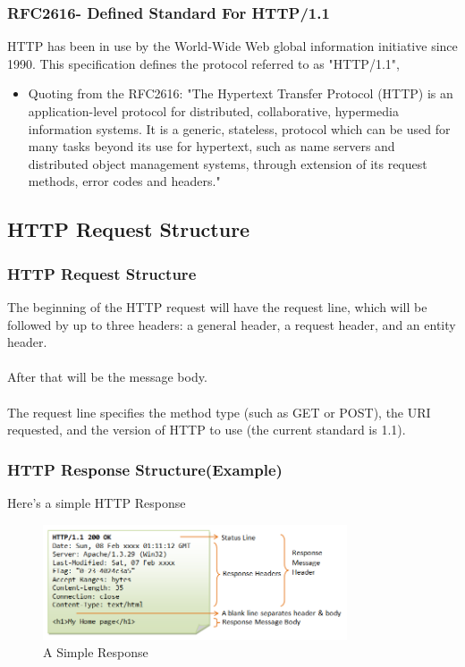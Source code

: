 \documentclass{beamer}
\begin{document}
\begin{frame}
\frametitle{RFC2616- Defined Standard For HTTP/1.1}
HTTP has been in use by the World-Wide Web global information initiative since 1990. This specification defines the protocol referred to as "HTTP/1.1",
\begin{itemize}
\item Quoting from the RFC2616: "The Hypertext Transfer Protocol (HTTP) is an application-level protocol for distributed, collaborative, hypermedia information systems. It is a generic, stateless, protocol which can be used for many tasks beyond its use for hypertext, such as name servers and distributed object management systems, through extension of its request methods, error codes and headers."

\end{itemize}
\end{frame}


\subsection{HTTP Request Structure}

\begin{frame}
\frametitle{HTTP Request Structure}
The beginning of the HTTP request will have the request line, which will be followed by up to three headers: a general header, a request header, and an entity header. \\~\\After that will be the message body. \\~\\The request line specifies the method type (such as GET or POST), the URI requested, and the version of HTTP to use (the current standard is 1.1).

\end{frame}


\begin{frame}
\frametitle{HTTP Response Structure(Example)}
Here's a simple HTTP Response
\begin{figure}[ht!]
\centering
\includegraphics[width=90mm]{HTTP_Response.png}
\caption{A Simple Response}
\label{overflow}
\end{figure}
\end{frame}
\end{document}
